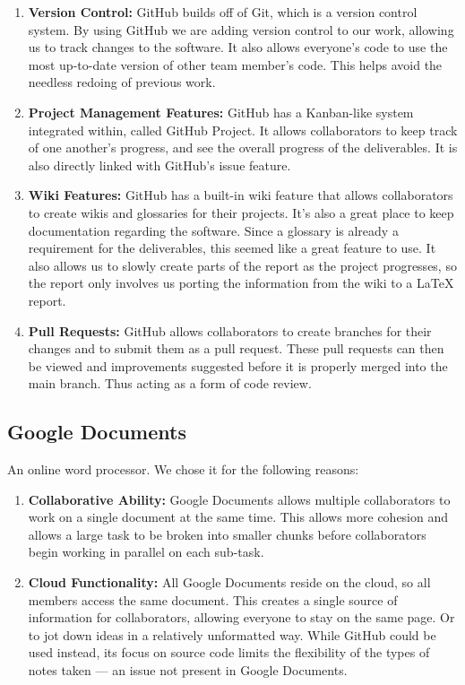 \documentclass[11pt,onside]{report}
\begin{document}
\begin{enumerate}
    \item \textbf{Version Control:} GitHub builds off of Git, which is a version control system. By using GitHub we are adding version control to our work, allowing us to track changes to the software. It also allows everyone’s code to use the most up-to-date version of other team member’s code. This helps avoid the needless redoing of previous work.
    
    \item \textbf{Project Management Features:} GitHub has a Kanban-like system integrated within, called GitHub Project. It allows collaborators to keep track of one another’s progress, and see the overall progress of the deliverables. It is also directly linked with GitHub's issue feature.
    
    \item \textbf{Wiki Features:} GitHub has a built-in wiki feature that allows collaborators to create wikis and glossaries for their projects. It's also a great place to keep documentation regarding the software. Since a glossary is already a requirement for the deliverables, this seemed like a great feature to use. It also allows us to slowly create parts of the report as the project progresses, so the report only involves us porting the information from the wiki to a \LaTeX{} report.
    
    \item \textbf{Pull Requests:} GitHub allows collaborators to create branches for their changes and to submit them as a pull request. These pull requests can then be viewed and improvements suggested before it is properly merged into the main branch. Thus acting as a form of code review.
\end{enumerate}

\subsection{Google Documents}

An online word processor. We chose it for the following reasons:

\begin{enumerate}
    \item \textbf{Collaborative Ability:} Google Documents allows multiple collaborators to work on a single document at the same time. This allows more cohesion and allows a large task to be broken into smaller chunks before collaborators begin working in parallel on each sub-task.
    
    \item \textbf{Cloud Functionality:} All Google Documents reside on the cloud, so all members access the same document. This creates a single source of information for collaborators, allowing everyone to stay on the same page. Or to jot down ideas in a relatively unformatted way. While GitHub could be used instead, its focus on source code limits the flexibility of the types of notes taken — an issue not present in Google Documents.
\end{enumerate}
\end{document}
